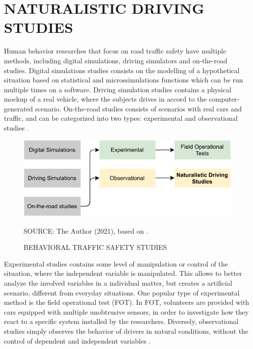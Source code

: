 \section{NATURALISTIC DRIVING STUDIES} \label{nds}

Human behavior researches that focus on road traffic safety have multiple methods, including digital simulations, driving simulators and on-the-road studies. Digital simulations studies consists on the modelling of a hypothetical situation based on statistical and microssimulations functions which can be run multiple times on a software. Driving simulation studies contains a physical mockup of a real vehicle, where the subjects drives in accord to the computer-generated scenario. On-the-road studies consists of scenarios with real cars and traffic, and can be categorized into two types: experimental and observational studies \cite{Shinar2017}. 

\begin{figure}[!htbp]
    \centering\footnotesize
    \captionsetup{font=footnotesize}
    \caption{BEHAVIORAL TRAFFIC SAFETY STUDIES}
    \includegraphics{fig/studies.pdf}
    \label{fig:shinar}
    \par SOURCE: The Author (2021), based on \textcite{Shinar2017}.
\end{figure}

Experimental studies contains some level of manipulation or control of the situation, where the independent variable is manipulated. This allows to better analyze the involved variables in a individual matter, but creates a artificial scenario, different from everyday situations. One popular type of experimental method is the field operational test (FOT). In FOT, volunteers are provided with cars equipped with multiple unobtrusive sensors, in order to investigate how they react to a specific system installed by the researchers. Diversely, observational studies simply observes the behavior of drivers in natural conditions, without the control of dependent and independent variables \cite{Shinar2017}. 

